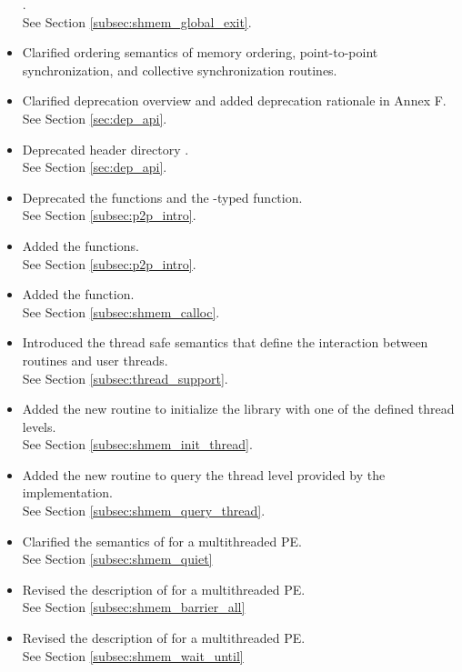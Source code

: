 \begin{itemize}
.
\\ See Section \ref{subsec:shmem_global_exit}.
%
\item Clarified ordering semantics of memory ordering, point-to-point synchronization, and collective 
synchronization routines.
%
\item Clarified deprecation overview and added deprecation rationale in Annex F.
\\See Section \ref{sec:dep_api}.
%
\item Deprecated header directory .
\\See Section \ref{sec:dep_api}.
%
\item Deprecated the  functions and the -typed \CorCpp {} function.
\\ See Section \ref{subsec:p2p_intro}.
%
\item Added the  functions.
\\ See Section \ref{subsec:p2p_intro}.
%
\item Added the  function.
\\ See Section \ref{subsec:shmem_calloc}.
%
\item Introduced the thread safe semantics that define the interaction between
    \openshmem routines and user threads.
\\See Section \ref{subsec:thread_support}.
%
\item Added the new routine  to initialize the
    \openshmem library with one of the defined thread levels.
\\See Section \ref{subsec:shmem_init_thread}.
%
\item Added the new routine  to query the thread
    level provided by the \openshmem implementation.
\\See Section \ref{subsec:shmem_query_thread}.
%
\item Clarified the semantics of  for a multithreaded
    \openshmem \ac{PE}.
\\See Section \ref{subsec:shmem_quiet}
%
\item Revised the description of  for a multithreaded
    \openshmem \ac{PE}.
\\See Section \ref{subsec:shmem_barrier_all}
%
\item Revised the description of  for a multithreaded
    \openshmem \ac{PE}.
\\See Section \ref{subsec:shmem_wait_until}

\end{itemize}
